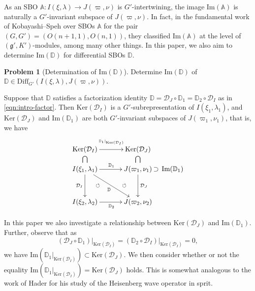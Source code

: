\documentclass[reqno,11pt]{amsart}
\theoremstyle{remark}
\theoremstyle{definition}
\newtheorem{prob}{Problem}
\numberwithin{equation}{section}
\newcommand{\Cal}{\mathcal}
\renewcommand{\Im}{\mathrm{Im}}
\newcommand{\Diff}{\mathrm{Diff}}
\newcommand{\Ker}{\mathrm{Ker}}
\newcommand{\D}{\Cal{D}}
\newcommand{\bD}{\mathbb{D}}
\newcommand{\bA}{\mathbb{A}}
\begin{document}
As an SBO $\bA \colon I(\xi,\lambda) \to J(\varpi,\nu)$
is $G'$-intertwining, the image $\Im(\bA)$ is naturally a $G'$-invariant subspace
 of $J(\varpi,\nu)$. In fact, in the fundamental work of Kobayashi--Speh 
\cite{KS15, KS18} over SBOs $\bA$ for the pair 
$(G,G')=(O(n+1,1), O(n,1))$, they classified $\Im(\bA)$ at the level of 
$(\mathfrak{g}', K')$-modules, among many other things. 
In this paper, we also aim to determine $\Im(\bD)$ for differential SBOs $\bD$. 

\begin{prob}[{Determination of  $\Im(\bD)$}]\label{prob:C}
Determine $\Im(\bD)$ of 
$\bD \in \Diff_{G'}(I(\xi,\lambda), J(\varpi,\nu))$.
\end{prob}

Suppose that $\bD$ satisfies a factorization identity 
$\bD=\D_J\circ \bD_1=\bD_2 \circ \D_I$
as in \eqref{eqn:intro-factor}. Then 
$\Ker(\D_I)$ is a $G'$-subrepresentation of $I(\xi_1,\lambda_1)$, 
and $\Ker(\D_J)$ and $\Im(\bD_1)$  are
both $G'$-invariant subspaces of $J(\varpi_1,\nu_1)$, that is, we have
\begin{equation}\label{eqn:intro-factor4}
\begin{aligned}
\xymatrix@=13pt{
\text{Ker}(\D_I)\ar@{}[d]|{\bigcap}
\ar[rr]^{\stackrel{\bD_1\vert_{\text{Ker}(\D_I)}}{\phantom{a}}} 
&&\text{Ker}(\D_J)
\ar@{}[d]|{\bigcap}&\\
I(\xi_1,\lambda_1)
 \ar[dd]_{\D_I}
  \ar[rrdd]_{\bD}
  \ar[rr]^{\bD_1}
 && J(\varpi_1,\nu_1)
   \ar[dd]^{\D_J}
  \ar@{}[ldd]|{\circlearrowleft}
\ar@{}[r]|*{\supset}&\hspace{-5pt} \text{Im}(\bD_1)
 \\
&&\\
I(\xi_2,\lambda_2)
\ar[rr]_{\bD_2}   \ar@{}[ruu]|{\circlearrowleft}
&&
J(\varpi_2,\nu_2)
}
\end{aligned}
\end{equation}

\noindent
In this paper we also investigate
a relationship between $\Ker(\D_J)$ and $\Im(\bD_1)$.
Further, observe that as
\begin{equation*}
(\D_J\circ \bD_1)\vert_{\text{Ker}(\D_I)}
=(\bD_2 \circ \D_I)\vert_{\text{Ker}(\D_I)}
=0,
\end{equation*}
we have $\Im(\bD_1\vert_{\text{Ker}(\D_I)}) \subset \text{Ker}(\D_J)$.
We then consider whether or not the equality
$\Im(\bD_1\vert_{\Ker(\D_I)}) = \Ker(\D_J)$ holds.
This is somewhat analogous to the work \cite{Hader22} of 
Hader for his study of the Heisenberg wave operator in sprit.
\end{document}
